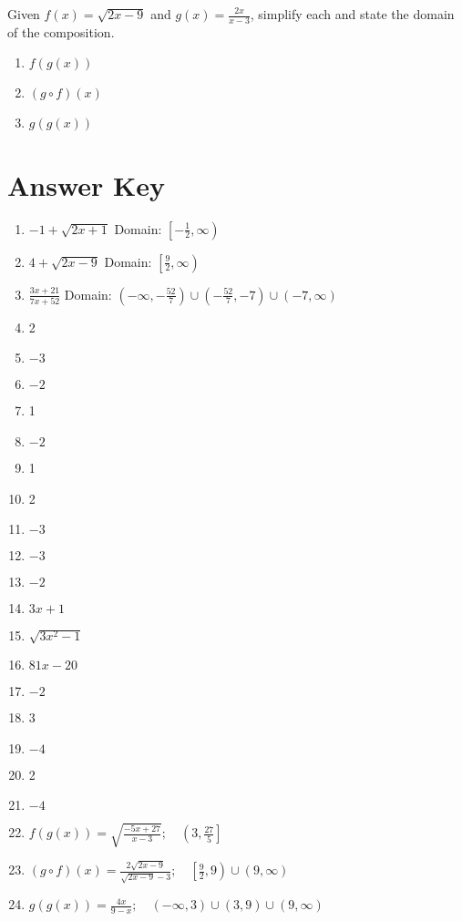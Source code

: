 Given $f(x) = \sqrt{2x-9}$ and $g(x) = \frac{2x}{x-3}$, simplify each and state the domain of the composition.

\begin{multicols}{3}
\begin{enumerate}	\setcounter{enumi}{\value{Review}}  
    \item $f(g(x))$
    \item $(g \circ f)(x)$
    \item $g(g(x))$
\end{enumerate}		\setcounter{Review}{\value{enumi}}
\end{multicols}

\newpage

\section{Answer Key}

\begin{enumerate}
	\item $-1 + \sqrt{2x+1}$ Domain: $\left[-\frac{1}{2}, \infty\right)$
	\item $4 + \sqrt{2x-9}$ Domain: $\left[\frac{9}{2}, \infty\right)$
	\item $\frac{3x+21}{7x+52}$ Domain: $\left(-\infty, -\frac{52}{7}\right) \cup \left(-\frac{52}{7}, -7\right) \cup (-7, \infty)$
	\item 2
     \item $-3$
     \item $-2$
     \item 1
     \item $-2$
     \item 1
     \item 2
     \item $-3$
     \item $-3$
     \item $-2$
     \item $3x + 1$
    \item $\sqrt{3x^2-1}$
    \item $81x-20$
    \item $-2$
    \item 3
    \item $-4$
    \item 2
    \item $-4$
    \item $f(g(x)) = \sqrt{\frac{-5x+27}{x-3}}; \quad \left(3, \frac{27}{5}\right]$
    \item $(g \circ f)(x) = \frac{2\sqrt{2x-9}}{\sqrt{2x-9}-3}; \quad \left[\frac{9}{2},9\right) \cup (9, \infty)$
    \item $g(g(x)) = \frac{4x}{9-x}; \quad (-\infty, 3) \cup (3, 9) \cup (9, \infty)$
\end{enumerate}